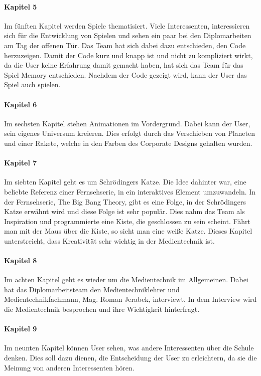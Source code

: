 \paragraph{Kapitel 5}
Im fünften Kapitel werden Spiele thematisiert. Viele Interessenten, interessieren sich für die Entwicklung von Spielen und sehen ein paar bei den Diplomarbeiten am Tag der offenen Tür. Das Team hat sich dabei dazu entschieden, den Code herzuzeigen. Damit der Code kurz und knapp ist und nicht zu kompliziert wirkt, da die User keine Erfahrung damit gemacht haben, hat sich das Team für das Spiel Memory entschieden. Nachdem der Code gezeigt wird, kann der User das Spiel auch spielen.
\paragraph{Kapitel 6}
Im sechsten Kapitel stehen Animationen im Vordergrund. Dabei kann der User, sein eigenes Universum kreieren. Dies erfolgt durch das Verschieben von Planeten und einer Rakete, welche in den Farben des Corporate Designs gehalten wurden. 
\paragraph{Kapitel 7}
Im siebten Kapitel geht es um Schrödingers Katze. Die Idee dahinter war, eine beliebte Referenz einer Fernsehserie, in ein interaktives Element umzuwandeln. In der Fernsehserie, The Big Bang Theory, gibt es eine Folge, in der Schrödingers Katze erwähnt wird und diese Folge ist sehr populär. Dies nahm das Team als Inspiration und programmierte eine Kiste, die geschlossen zu sein scheint. Fährt man mit der Maus über die Kiste, so sieht man eine weiße Katze. Dieses Kapitel unterstreicht, dass Kreativität sehr wichtig in der Medientechnik ist.
\paragraph{Kapitel 8}
Im achten Kapitel geht es wieder um die Medientechnik im Allgemeinen. Dabei hat das Diplomarbeitsteam den Medientechniklehrer und Medientechnikfachmann, Mag. Roman Jerabek, interviewt. In dem Interview wird die Medientechnik besprochen und ihre Wichtigkeit hinterfragt.
\paragraph{Kapitel 9}
Im neunten Kapitel können User sehen, was andere Interessenten über die Schule denken. Dies soll dazu dienen, die Entscheidung der User zu erleichtern, da sie die Meinung von anderen Interessenten hören.

